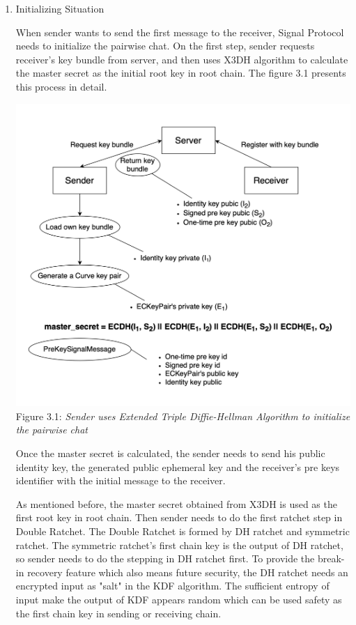 \begin{enumerate}[label=(\roman*)]
\item Initializing Situation

When sender wants to send the first message to the receiver, Signal Protocol needs to initialize the pairwise chat. On the first step, sender requests receiver's key bundle from server, and then uses X3DH algorithm to calculate the master secret as the initial root key in root chain. The figure 3.1 presents this process in detail.

\begin{center}
\includegraphics[scale=.5]{../3-Background/resources/X3DH.png}\\
Figure 3.1: \textit{Sender uses Extended Triple Diffie-Hellman Algorithm to initialize the pairwise chat}
\end{center}

\clearpage

Once the master secret is calculated, the sender needs to send his public identity key, the generated public ephemeral key and the receiver's pre keys identifier with the initial message to the receiver.

As mentioned before, the master secret obtained from X3DH is used as the first root key in root chain. Then sender needs to do the first ratchet step in Double Ratchet. The Double Ratchet is formed by DH ratchet and symmetric ratchet. The symmetric ratchet's first chain key is the output of DH ratchet, so sender needs to do the stepping in DH ratchet first. To provide the break-in recovery feature which also means future security, the DH ratchet needs an encrypted input as "salt" in the KDF algorithm. The sufficient entropy of input make the output of KDF appears random which can be used safety as the first chain key in sending or receiving chain.


\end{enumerate}
